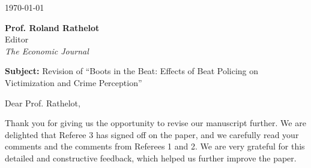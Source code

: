 \documentclass[11pt,english]{article}
\begin{document}


\makeatletter
{\def\@currentlabel{1}\label{introduction}}
{\def\@currentlabel{2}\label{institutions}}
{\def\@currentlabel{3}\label{identification}}
{\def\@currentlabel{1}\label{eq:main}}
{\def\@currentlabel{4}\label{results}}
{\def\@currentlabel{4.1}\label{main_results}}
{\def\@currentlabel{4.2}\label{sec:spillovers}}
{\def\@currentlabel{4.3}\label{heterogeneity}}
{\def\@currentlabel{4.4}\label{mechanisms}}
{\def\@currentlabel{5}\label{conclusions}}
{\def\@currentlabel{A}\label{sec:appendixA}}
{\def\@currentlabel{B}\label{sec:appendixB}}
{\def\@currentlabel{B.4}\label{resources_plan_cuadrante}}
{\def\@currentlabel{C}\label{sec:appendixC}}
{\def\@currentlabel{C.4}\label{sec:admin_uncapped}}
{\def\@currentlabel{C.5}\label{sec:bonferroni}}
{\def\@currentlabel{C.8}\label{sec:earthquake}}
\makeatother

\doublespacing
\begin{flushright}
\today \\[24pt]
\end{flushright}

\vspace{1em}

\noindent \textbf{Prof. Roland Rathelot}\\
Editor \\
\textit{The Economic Journal}

\vspace{0.5em}

\noindent \textbf{Subject:} Revision of ``Boots in the Beat: Effects of Beat Policing on Victimization and Crime Perception''

\vspace{1.5em}

Dear Prof. Rathelot,

Thank you for giving us the opportunity to revise our manuscript further. We are delighted that Referee 3 has signed off on the paper, and we carefully read your comments and the comments from Referees 1 and 2. We are very grateful for this detailed and constructive feedback, which helped us further improve the paper.
\end{document}
